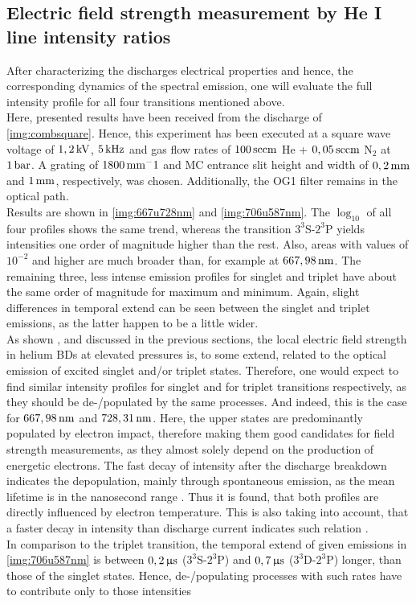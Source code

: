 \documentclass[a4paper,10pt,twoside]{article}
\newcommand{\tenpo}[1]{ 10^{#1}}
\newcommand{\ix}[1]{_\text{#1}}
\begin{document}
	\subsection{Electric field strength measurement by He I line intensity ratios}
		
		After characterizing the discharges electrical properties and hence, the corresponding dynamics of the spectral emission, one will evaluate the full intensity profile for all four transitions mentioned above.\\
		Here, presented results have been received from the discharge of \autoref{img:combsquare}. Hence, this experiment has been executed at a square wave voltage of $\unit[1,2]{kV}$, $\unit[5]{kHz}$ and gas flow rates of $\unit[100]{sccm}$ He + $\unit[0,05]{sccm}$ N$_2$ at $\unit[1]{bar}$. A grating of $\unit[1800]{mm^-1}$ and MC entrance slit height and width of $\unit[0,2]{mm}$ and $\unit[1]{mm}$, respectively, was chosen. Additionally, the OG1 filter remains in the optical path.\\
		Results are shown in \autoref{img:667u728nm} and \autoref{img:706u587nm}. The $\log\ix{10}$ of all four profiles shows the same trend, whereas the transition $3^3$S-$2^3$P yields intensities one order of magnitude higher than the rest. Also, areas with values of $\tenpo{-2}$ and higher are much broader than, for example at $\unit[667,98]{nm}$. The remaining three, less intense emission profiles for singlet and triplet have about the same order of magnitude for maximum and minimum. Again, slight differences in temporal extend can be seen between the singlet and triplet emissions, as the latter happen to be a little wider.\\
		As shown \cite{linratio1_14}, \cite{linratio1_14} and discussed in the previous sections, the local electric field strength in helium BDs at elevated pressures is, to some extend, related to the optical emission of excited singlet and/or triplet states. Therefore, one would expect to find similar intensity profiles for singlet and for triplet transitions respectively, as they should be de-/populated by the same processes. And indeed, this is the case for $\unit[667,98]{nm}$ and $\unit[728,31]{nm}$. Here, the upper states are predominantly populated by electron impact, therefore making them good candidates for field strength measurements, as they almost solely depend on the production of energetic electrons. The fast decay of intensity after the discharge breakdown indicates the depopulation, mainly through spontaneous emission, as the mean lifetime is in the nanosecond range \cite{linratio1_14}. Thus it is found, that both profiles are directly influenced by electron temperature. This is also taking into account, that a faster decay in intensity than discharge current indicates such relation \cite{electron_temp}.\\
		In comparison to the triplet transition, the temporal extend of given emissions in \autoref{img:706u587nm} is between $\unit[0,2]{\upmu s}$ ($3^3$S-$2^3$P) and $\unit[0,7]{\upmu s}$ ($3^3$D-$2^3$P) longer, than those of the singlet states. Hence, de-/populating processes with such rates have to contribute only to those intensities
		
\end{document}
